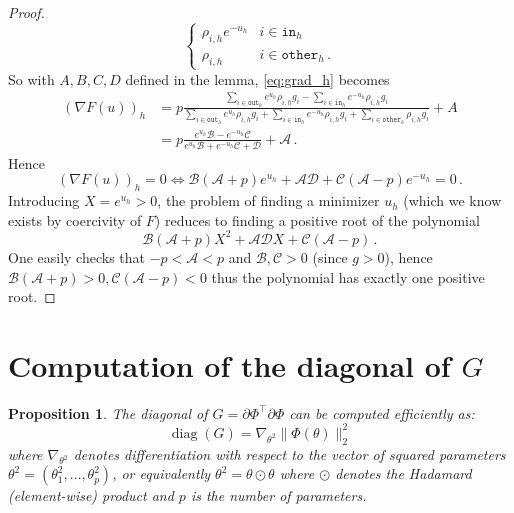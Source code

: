 \documentclass{article}
\theoremstyle{plain}
\newtheorem{proposition}[theorem]{Proposition}
\theoremstyle{definition}
\theoremstyle{remark}
\def\diag{\text{diag}}
\def\diag{\operatorname{diag}}
\newcommand{\Ah}{\mathcal{A}}
\newcommand{\Bh}{\mathcal{B}}
\newcommand{\Ch}{\mathcal{C}}
\newcommand{\Dh}{\mathcal{D}}
\begin{document}
{\begin{proof}
\begin{equation}
\begin{cases}
\rho_{i,h}  e^{-u_h}& i \in \texttt{in}_h \\
\rho_{i,h} & i \in \texttt{other}_h\,.
\end{cases}
\end{equation}
So with $A, B,C,D$ defined in the lemma, \eqref{eq:grad_h} becomes
\begin{equation}
\begin{split}
(\nabla F(u))_h &= p\frac{\sum_{i \in \texttt{out}_h} e^{u_h} \rho_{i,h} g_i
- \sum_{i \in \texttt{in}_h} e^{-u_h} \rho_{i,h}g_i}{\sum_{i \in \texttt{out}_h} e^{u_h}\rho_{i,h} g_i 
+ \sum_{i \in \texttt{in}_h} e^{-u_h} \rho_{i,h} g_i + \sum_{i \in \texttt{other}_h} \rho_{i,h} g_i} + A \\
&= p\frac{e^{u_h} \Bh - e^{-u_h} \Ch}{e^{u_h} \Bh + e^{-u_h}\Ch + \Dh} + \Ah\,.
\end{split}
\end{equation}
Hence
\begin{equation}
(\nabla F(u))_h = 0 \iff \Bh(\Ah + p) e^{u_h}+ \Ah \Dh + \Ch(\Ah - p)e^{-u_h} = 0\,.
\end{equation}
Introducing $X = e^{u_h}>0$, the problem of finding a minimizer $u_{h}$ (which we know exists by coercivity of $F$) reduces to finding a positive root of the polynomial
\begin{equation}
\Bh(\Ah + p) X^2 + \Ah \Dh X + \Ch(\Ah-p)\,.
\end{equation}
One easily checks that $-p <\Ah < p$ and $\Bh, \Ch  >0$ (since $g > 0$), hence $\Bh( \Ah +  p) > 0,  \Ch( \Ah-p) < 0$ thus the polynomial has exactly one positive root.
\end{proof}



\section{Computation of the diagonal of $G$}
\label{sec:G_matrix}

\begin{proposition}
    The diagonal of $G = \partial \Phi^\top \partial \Phi$ can be computed efficiently as:
    \begin{equation}
        \label{eq:diag_g}
        \diag(G) = \nabla_{\theta^2} \| \Phi(\theta) \|_2^2 
    \end{equation}
where $\nabla_{\theta^2}$ denotes differentiation with respect to the vector of squared parameters $\theta^2 = (\theta_1^2, \ldots, \theta_p^2)$, or equivalently $\theta^2 = \theta \odot \theta$ where $\odot$ denotes the Hadamard (element-wise) product and $p$ is the number of parameters.


\end{proposition}}
\end{document}

